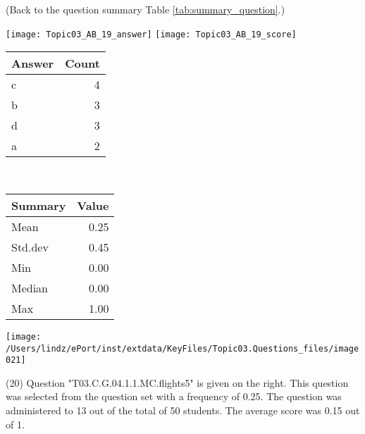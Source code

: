 \documentclass[12pt,english,nohyper]{tufte-handout}\usepackage[]{graphicx}\usepackage[]{color}
\begin{document}
 (Back to the question summary Table \ref{tab:summary_question}.)

\begin{center} \texttt{[image: Topic03\_AB\_19\_answer]} \texttt{[image: Topic03\_AB\_19\_score]} \end{center} 

\begin{center}%
\begin{tabular}{lr}
  \hline
Answer & Count \\ 
  \hline
c &   4 \\ 
  b &   3 \\ 
  d &   3 \\ 
  a &   2 \\ 
   \hline
\end{tabular}
~~~~~~~~%
\begin{tabular}{lr}
  \hline
Summary & Value \\ 
  \hline
Mean & 0.25 \\ 
  Std.dev & 0.45 \\ 
  Min & 0.00 \\ 
  Median & 0.00 \\ 
  Max & 1.00 \\ 
   \hline
\end{tabular}
\end{center}\newpage{}



\vspace{4cm}\begin{marginfigure}\texttt{[image: /Users/lindz/ePort/inst/extdata/KeyFiles/Topic03.Questions\_files/image021]}\end{marginfigure}\vspace{-4cm} (20) Question "T03.C.G.04.1.1.MC.flights5" is given on the right. This question was selected from the question set with a frequency of 0.25. The question was administered to 13 out of the total of 50 students. The average score was 0.15 out of 1.
\end{document}
